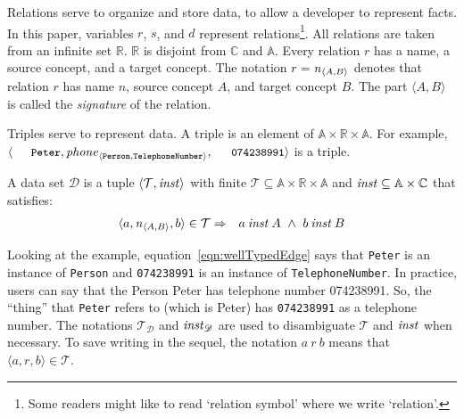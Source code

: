 \documentclass[runningheads]{llncs}
\newcommand{\id}[1]{\text{\it #1\/}}
\newcommand{\instance}{\mathbin{\id{inst}}}
\newcommand{\declare}[3]{\id{#1}_{\pair{#2}{#3}}}
\newcommand{\pair}[2]{\langle{#1},{#2}\rangle}
\newcommand{\Pair}[2]{#1\times#2}
\newcommand{\triple}[3]{\langle{#1},{#2},{#3}\rangle}
\newcommand{\atom}[1]{{\tt\small #1}}
\newcommand{\Atoms}{\mathbb{A}}
\newcommand{\Concepts}{\mathbb{C}}
\newcommand{\Rels}{\mathbb{R}}   %
\newcommand{\triples}{\mathcal{T}}
\newcommand{\Triple}[3]{#1\times#2\times#3}
\newcommand{\dataset}{\mathscr{D}}
\begin{document}
   Relations serve to organize and store data, to allow a developer to represent facts.
   In this paper, variables $r$, $s$, and $d$ represent relations\footnote{Some readers might like to read `relation symbol' where we write `relation'.}.
   All relations are taken from an infinite set $\Rels$.
   $\Rels$ is disjoint from $\Concepts$ and $\Atoms$.
   Every relation $r$ has a name, a source concept, and a target concept.
   The notation $r=\declare{n}{A}{B}$ denotes that relation $r$ has name $n$, source concept $A$, and target concept $B$.
   The part $\pair{A}{B}$ is called the {\em signature} of the relation.
   
   Triples serve to represent data.
   A triple %
   is an element of $\Triple{\Atoms}{\Rels}{\Atoms}$.
   For example, $\triple{\text{\atom{Peter}}}{\declare{\id{phone}}{\tt Person}{\tt TelephoneNumber}}{\text{\atom{074238991}}}$ is a triple.
   
   \begin{definition}
   A data set $\dataset$ is a tuple $\pair{\triples}{\instance}$ with finite $\triples \subseteq {\Triple{\Atoms}{\Rels}{\Atoms}}$ and $\instance \subseteq  {\Pair{\Atoms}{\Concepts}}$ that satisfies:
\begin{eqnarray}
   \triple{a}{\declare{n}{A}{B}}{b}\in\triples&\Rightarrow&a\instance A\ \wedge\ b\instance B
   \label{eqn:wellTypedEdge}
\end{eqnarray}
\end{definition}
   Looking at the example,
   equation~\ref{eqn:wellTypedEdge} says that \atom{Peter} is an instance of {\tt Person} and \atom{074238991} is an instance of {\tt TelephoneNumber}.
   In practice, users can say that the Person Peter has telephone number 074238991.
   So, the ``thing'' that \atom{Peter} refers to (which is Peter) has \atom{074238991} as a telephone number.
   The notations $\triples_{\dataset}$ and $\instance_{\dataset}$ are used to disambiguate $\triples$ and $\instance$ when necessary.
   To save writing in the sequel, the notation $a\ r\ b$ means that $\triple{a}{r}{b}\in\triples$.
\end{document}
